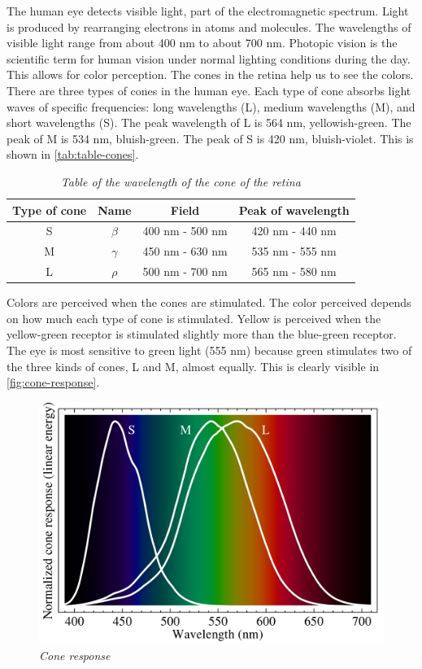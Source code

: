 \documentclass[paper=a4, fontsize=10pt]{scrartcl}	%
\begin{document}
	The human eye detects visible light, part of the electromagnetic spectrum. Light is produced by rearranging electrons in atoms and molecules. The wavelengths of visible light range from about 400 nm to about 700 nm. Photopic vision is the scientific term for human vision under normal lighting conditions during the day. This allows for color perception. The cones in the retina help us to see the colors. There are three types of cones in the human eye. Each type of cone absorbs light waves of specific frequencies: long wavelengths (L), medium wavelengths (M), and short wavelengths (S). The peak wavelength of L is 564 nm, yellowish-green. The peak of M is 534 nm, bluish-green. The peak of S is 420 nm, bluish-violet. This is shown in \autoref{tab:table-cones}.

	\begin{table}[H]
		\centering
		\begin{center}
			\begin{tabular}{ |c|c|c|c| } 
				\hline
				\textbf{Type of cone} & \textbf{Name} & \textbf{Field} & \textbf{Peak of wavelength} \\ 
				\hline
				S & \(\beta\) & 400 nm - 500 nm & 420 nm - 440 nm \\
				\hline
				M & \(\gamma\) & 450 nm - 630 nm & 535 nm - 555 nm \\
				\hline
				L & \(\rho\) & 500 nm - 700 nm & 565 nm - 580 nm \\
				\hline
			\end{tabular}
		\end{center}
		\caption{\textit{Table of the wavelength of the cone of the retina}}
		\label{tab:table-cones}
	\end{table}
	
	Colors are perceived when the cones are stimulated. The color perceived depends on how much each type of cone is stimulated. Yellow is perceived when the yellow-green receptor is stimulated slightly more than the blue-green receptor. The eye is most sensitive to green light (555 nm) because green stimulates two of the three kinds of cones, L and M, almost equally. This is clearly visible in \autoref{fig:cone-response}.

	\begin{figure}[H]
		\centering
		\includegraphics[width=0.75\linewidth]{images/eye/2880px-Cone-fundamentals-with-srgb-spectrum.svg.png}
		\caption{\textit{Cone response}}
		\label{fig:cone-response}
	\end{figure}
\end{document}
